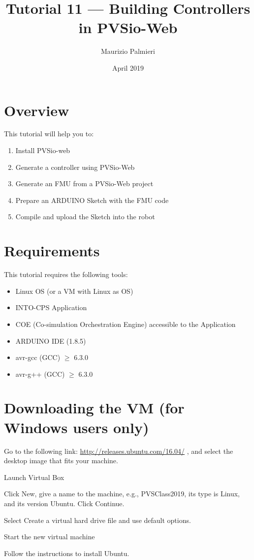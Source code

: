 \documentclass[11pt,a4paper]{../tutorial}
\title{Tutorial 11 --- Building Controllers in PVSio-Web}
\date{April 2019}
\author{Maurizio Palmieri}
\begin{document}
\section*{Overview}

This tutorial will help you to:

\begin{enumerate}[noitemsep]
\item Install PVSio-web
\item Generate a  controller using PVSio-Web
\item Generate an FMU from a PVSio-Web project
\item Prepare an ARDUINO Sketch with the FMU code 
\item Compile and upload the Sketch into the robot 
\end{enumerate}

\section*{Requirements}

This tutorial requires the following tools:

\begin{itemize}[noitemsep]
\item Linux OS (or a VM with Linux as OS)
\item INTO-CPS Application
\item COE (Co-simulation Orchestration Engine) accessible to the Application
\item ARDUINO IDE (1.8.5) 
\item avr-gcc (GCC) $\geq$ 6.3.0
\item avr-g++ (GCC) $\geq$ 6.3.0   

\end{itemize}




\section{Downloading the VM (for Windows users only)}
\begin{instructions}
\item Go to the following link: \url{http://releases.ubuntu.com/16.04/} , and select the desktop image that fits your machine.
\item Launch Virtual Box
\item Click New, give a name to the machine, e.g., PVSClass2019, its type is Linux, and its version Ubuntu. Click Continue.
\item Select Create a virtual hard drive file and use default options.
\item  Start the new virtual machine
\item Follow the instructions to install Ubuntu.

\end{instructions}
\end{document}
